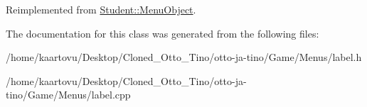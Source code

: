 Reimplemented from \hyperlink{class_student_1_1_menu_object_ad014a4bd1e775c1be6689ffe018fed6b}{Student\-::\-Menu\-Object}.



The documentation for this class was generated from the following files\-:\begin{DoxyCompactItemize}
\item 
/home/kaartovu/\-Desktop/\-Cloned\-\_\-\-Otto\-\_\-\-Tino/otto-\/ja-\/tino/\-Game/\-Menus/label.\-h\item 
/home/kaartovu/\-Desktop/\-Cloned\-\_\-\-Otto\-\_\-\-Tino/otto-\/ja-\/tino/\-Game/\-Menus/label.\-cpp\end{DoxyCompactItemize}

